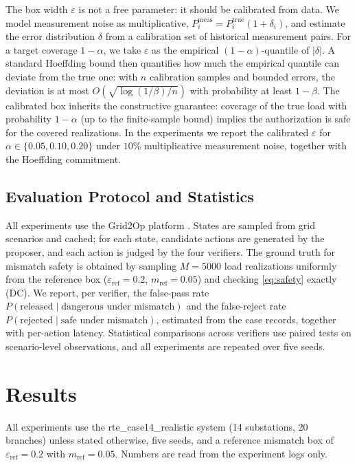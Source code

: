 \documentclass[journal]{IEEEtran}
\begin{document}
The box width $\varepsilon$ is not a free parameter: it should be calibrated
from data. We model measurement noise as multiplicative,
$P^{\text{meas}}_i = P^{\text{true}}_i(1+\delta_i)$, and estimate the error
distribution $\delta$ from a calibration set of historical measurement pairs.
For a target coverage $1-\alpha$, we take $\varepsilon$ as the empirical
$(1-\alpha)$-quantile of $|\delta|$. A standard Hoeffding bound then quantifies
how much the empirical quantile can deviate from the true one: with $n$
calibration samples and bounded errors, the deviation is at most
$O(\sqrt{\log(1/\beta)/n})$ with probability at least $1-\beta$. The
calibrated box inherits the constructive guarantee: coverage of the true load
with probability $1-\alpha$ (up to the finite-sample bound) implies the
authorization is safe for the covered realizations. In the experiments we
report the calibrated $\varepsilon$ for $\alpha \in \{0.05, 0.10, 0.20\}$
under $10\%$ multiplicative measurement noise, together with the Hoeffding
commitment.

\subsection{Evaluation Protocol and Statistics}
\label{sec:evalproto}

All experiments use the Grid2Op platform \cite{grid2op2025}. States are sampled
from grid scenarios and cached; for each state, candidate actions are generated
by the proposer, and each action is judged by the four verifiers. The ground truth for mismatch safety is obtained by sampling
$M = 5000$ load realizations uniformly from the reference box
($\varepsilon_{\text{ref}} = 0.2$, $m_{\text{ref}} = 0.05$) and checking
\eqref{eq:safety} exactly (DC). We report, per verifier, the false-pass rate
$P(\text{released} \mid \text{dangerous under mismatch})$ and the false-reject
rate $P(\text{rejected} \mid \text{safe under mismatch})$, estimated from the
case records, together with per-action latency. Statistical comparisons across
verifiers use paired tests on scenario-level observations, and all experiments
are repeated over five seeds.

\section{Results}
\label{sec:results}

All experiments use the rte\_case14\_realistic system (14 substations, 20
branches) unless stated otherwise, five seeds, and a reference mismatch box of
$\varepsilon_{\text{ref}} = 0.2$ with $m_{\text{ref}} = 0.05$. Numbers are read
from the experiment logs only.
\end{document}
